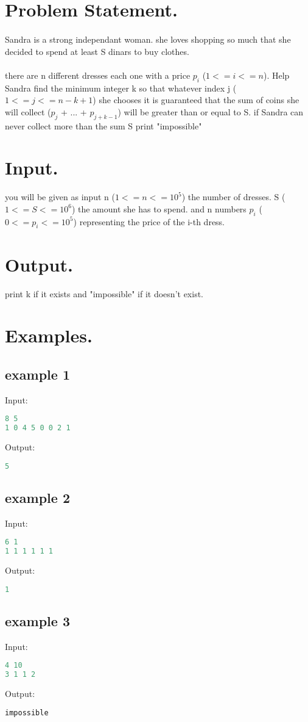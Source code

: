 \documentclass[8pt]{article}
\begin{document}
\section{Problem Statement.}
\paragraph{}
Sandra is a strong independant woman. she loves shopping so much that she decided to spend at least S dinars to buy clothes.
\paragraph{}
there are n different dresses each one with a price $p_i$ ($1<=i<=n$).
Help Sandra find the minimum integer k so that whatever index j ($1<=j<=n-k+1$) she chooses it is guaranteed 
that the sum of coins she will collect ($p_j$ + ... + $p_{j+k-1}$) will be greater than or equal to S.
if Sandra can never collect more than the sum S print "impossible"
\section{Input.}
you will be given as input n ($1<=n<=10^5$) the number of dresses. S ($1<=S<=10^6$) the amount she has to spend.
and n numbers $p_i$ ($0<=p_i<=10^5$) representing the price of the i-th dress.
\section{Output.}
print k if it exists and "impossible" if it doesn't exist.

\section{Examples.}
\subsection{example 1}
Input:
\begin{lstlisting}[language=Python]
8 5
1 0 4 5 0 0 2 1
\end{lstlisting}
Output:
\begin{lstlisting}[language=Python]
5
\end{lstlisting}
\subsection{example 2}
Input:
\begin{lstlisting}[language=Python]
6 1
1 1 1 1 1 1
\end{lstlisting}
Output:
\begin{lstlisting}[language=Python]
1
\end{lstlisting}
\subsection{example 3}
Input:
\begin{lstlisting}[language=Python]
4 10
3 1 1 2
\end{lstlisting}
Output:
\begin{lstlisting}[language=Python]
impossible
\end{lstlisting}
\end{document}
